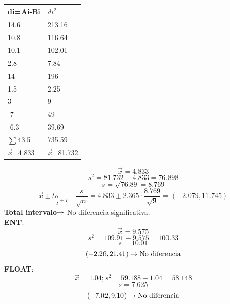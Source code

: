 \begin{tcolorbox}[colback=white,colframe=cyan!50!black,fonttitle=\bfseries]
\begin{table}[H]
\centering
\begin{tabular}{|l|l|}
\hline
\textbf{di=Ai-Bi} & \textbf{$di^2$} \\ \hline
14.6              & 213.16       \\ \hline
10.8              & 116.64       \\ \hline
10.1              & 102.01       \\ \hline
2.8               & 7.84         \\ \hline
14                & 196          \\ \hline
1.5               & 2.25         \\ \hline
3                 & 9            \\ \hline
-7                & 49           \\ \hline
-6.3              & 39.69        \\ \hline
$\sum$43.5              & 735.59       \\ \hline
$\Vec{x}$=4.833           & $\Vec{x}$=81.732     \\ \hline
\end{tabular}
\end{table}
\noindent
\[
\Vec{x}=4.833
\]
\[
s^2=81.732-4.833=76.898
\]
\[
s=\sqrt{76.89}=8.769
\]
\[
\Vec{x}\pm t_{\dfrac{\alpha}{2}+7}\quad \dfrac{s}{\sqrt{n}}=4.833\pm 2.365\cdot\dfrac{8.769}{\sqrt{9}}=(-2.079,11.745)
\]
\textbf{Total intervalo}$\rightarrow$ No diferencia significativa.\\
\textbf{ENT}:
\[
\Vec{x}=9.575
\]
\[
s^2=109.91-9.575=100.33
\]
\[
s=10.01
\]
\[
(-2.26,21.41)\rightarrow\text{No diferencia}
\]
\textbf{FLOAT}:
\[
\Vec{x}=1.04; s^2=59.188-1.04=58.148
\]
\[
s=7.625
\]
\[
(-7.02,9.10)\rightarrow\text{No diferencia}
\]
\end{tcolorbox} 
